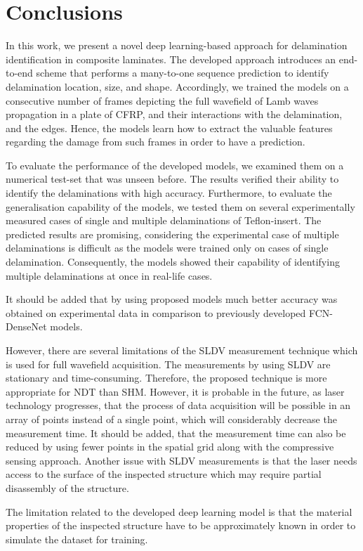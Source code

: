 \section{Conclusions}
\label{conclusion}
In this work, we present a novel deep learning-based approach for delamination identification in composite laminates.
The developed approach introduces an end-to-end scheme that performs a many-to-one sequence prediction to identify delamination location, size, and shape.
Accordingly, we trained the models on a consecutive number of frames depicting the full wavefield of Lamb waves propagation in a plate of CFRP, and their interactions with the delamination, and the edges.
Hence, the models learn how to extract the valuable features regarding the damage from such frames in order to have a prediction.

To evaluate the performance of the developed models, we examined them on a numerical test-set that was unseen before.
The results verified their ability to identify the delaminations with high accuracy. 
Furthermore, to evaluate the generalisation capability of the models, we tested them on several experimentally measured cases of single and multiple delaminations of Teflon-insert.
The predicted results are promising, considering the experimental case of multiple delaminations is difficult as the models were trained only on cases of single delamination.
Consequently, the models showed their capability of identifying multiple delaminations at once in real-life cases.

It should be added that by using proposed models much better accuracy was obtained on experimental data in comparison to previously developed FCN-DenseNet models.

However, there are several limitations of the SLDV measurement technique which is used for full wavefield acquisition.
The measurements by using SLDV are stationary and time-consuming.
Therefore, the proposed technique is more appropriate for NDT than SHM.
However, it is probable in the future, as
laser technology progresses, that the process of data acquisition will be possible in an array of points instead of a single point, which will considerably decrease the measurement time.
It should be added, that the measurement time can also be reduced by using fewer points in the spatial grid along with the compressive sensing approach.
Another issue with SLDV measurements is that the laser needs access to the surface of the inspected structure which may require partial disassembly of the structure.

The limitation related to the developed deep learning model is that the material properties of the inspected structure have to be approximately known in order to simulate the dataset for training.


